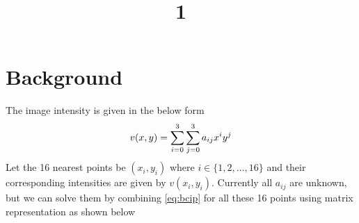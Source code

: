 \documentclass[a4paper, landscape]{article}
\title{1}
\date{}
\begin{document}
\maketitle
\section{Background}
The image intensity is given in the below form
\begin{equation}{\label{eq:bcip}}
		v(x,y)= \sum_{i=0}^{3}\sum_{j=0}^{3} a_{ij}x^i y^j
\end{equation}
Let the 16 nearest points be $(x_i, y_i)$ where $i\in\{1,2,\ldots,16\}$ and their corresponding intensities are given by $v(x_i, y_i)$.
Currently all $a_{ij}$ are unknown, but we can solve them by combining \ref{eq:bcip} for all these 16 points using matrix representation as shown below 
\end{document}
